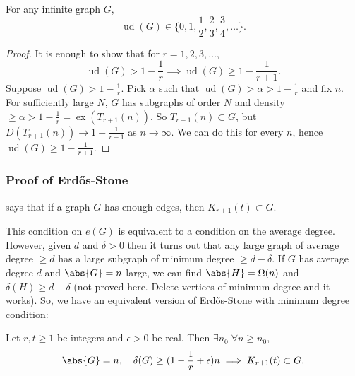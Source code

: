 \documentclass{article}
\DeclareMathOperator{\ext}{ex}
\DeclareMathOperator{\ud}{ud}
\newenvironment{manualtheorem}[1]{%
    \renewcommand\themanualtheoreminner{#1}%
    \manualtheoreminner
}{\endmanualtheoreminner}
\begin{document}
\begin{ncor}
    For any infinite graph $G$,
    \begin{equation*}
        \ud(G) \in \{0, 1, \frac{1}{2}, \frac{2}{3}, \frac{3}{4}, \dotsc\}.
    \end{equation*}
\end{ncor}

\begin{proof}
    It is enough to show that for $r = 1, 2, 3, \dotsc$,
    \begin{equation*}
        \ud(G) > 1 - \frac{1}{r} \implies \ud(G) \geq 1 - \frac{1}{r+1}.
    \end{equation*}
    Suppose $\ud(G) > 1 - \frac{1}{r}$.  Pick $\alpha$ such that $\ud(G) > \alpha > 1 - \frac{1}{r}$ and fix $n$.
    For sufficiently large $N$, $G$ has subgraphs of order $N$ and density $\geq \alpha > 1 - \frac{1}{r} = \ext(T_{r+1}(n))$.
    So $T_{r+1}(n) \subset G$, but $D(T_{r+1}(n)) \to 1 - \frac{1}{r+1}$ as $n \to \infty$.
    We can do this for every $n$, hence $\ud(G) \geq 1 - \frac{1}{r+1}$.
\end{proof}

\subsubsection{Proof of Erd\H{o}s-Stone}
 says that if a graph $G$ has enough edges, then $K_{r+1}(t) \subset G$.

This condition on $e(G)$ is equivalent to a condition on the average degree.
However, given $d$ and $\delta > 0$ then it turns out that any large graph of average degree $\geq d$ has a large subgraph of minimum degree $\geq d - \delta$.
If $G$ has average degree $d$ and $\abs{G} = n$ large, we can find $\abs{H} = \Omega(n)$ and $\delta(H) \geq d - \delta$ (not proved here. Delete vertices of minimum degree and it works).
So, we have an equivalent version of Erd\H{o}s-Stone with minimum degree condition:

\begin{manualtheorem}{14a}\label{thm:14a}
    Let $r, t \geq 1$ be integers and $\epsilon > 0$ be real. Then $\exists n_0 \; \forall n \geq n_0$,
    \begin{equation*}
        \abs{G} = n, \quad \delta(G) \geq (1 - \frac{1}{r} + \epsilon) n \implies K_{r+1}(t) \subset G.
    \end{equation*}
\end{manualtheorem}
\end{document}
